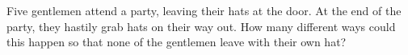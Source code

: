 \documentclass{book}
\begin{document}
\setcounter{project}{229}
\addtocounter{project}{-1}
\begin{activity}[]\label{activity-222}
\hypertarget{p-1265}{}%
Five gentlemen attend a party, leaving their hats at the door. At the end of the party, they hastily grab hats on their way out. How many different ways could this happen so that none of the gentlemen leave with their own hat?%
\end{activity}
\end{document}
